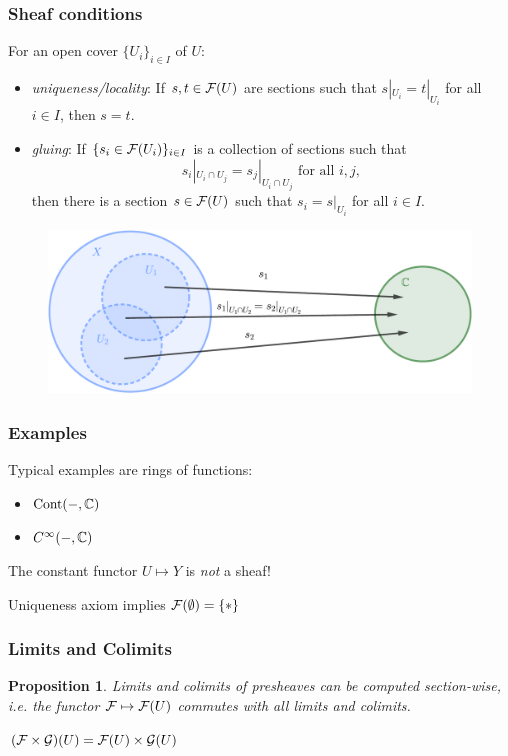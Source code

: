 \documentclass{beamer}
\newtheorem{proposition}{Proposition}
\DeclareMathOperator{\Cont}{Cont}
\begin{document}
\begin{frame}
    \frametitle{Sheaf conditions}

    For an open cover $\{U_i\}_{i\in I}$ of $U$:
    \begin{itemize}
        \item \emph{uniqueness/locality}: If $s,t\in \mathcal{F}(U)$ are sections such that
              $s|_{U_i} = t|_{U_i}$ for all $i\in I$, then $s=t$.
              \pause
        \item \emph{gluing}: If $\{s_i \in \mathcal{F}(U_i)\}_{i\in I}$ is
              a collection of sections such that
              \begin{equation*}
                  s_i|_{U_i \cap U_j} = s_j|_{U_i \cap U_j} \text { for all } i, j,
              \end{equation*}
              then there is a section $s\in \mathcal{F}(U)$ such that $s_i = s|_{U_i}$ for all $i \in I$.
    \end{itemize}
    \begin{figure}
        \centering
        \includegraphics[scale=0.3]{Sheaf_condition.pdf}
    \end{figure}

\end{frame}
\begin{frame}
    \frametitle{Examples}

    Typical examples are rings of functions:
    \begin{itemize}
        \item $\Cont(-, \bbC)$
        \item $C^\infty(-, \mathbb{C})$
    \end{itemize}
    \pause
    \medskip

    \medskip
    The constant functor $U \mapsto Y$ is \emph{not} a sheaf!

    Uniqueness axiom implies $\mathcal{F}(\emptyset) = \{*\}$
\end{frame}

\begin{frame}
    \frametitle{Limits and Colimits}

    \begin{proposition}
        Limits and colimits of presheaves can be computed
        section-wise, i.e. the functor $\mathcal{F} \mapsto \mathcal{F}(U)$
        commutes with all limits and colimits.
    \end{proposition}

    \pause
    \begin{example}
        $(\mathcal{F}\times \mathcal{G} )(U) = \mathcal{F}(U) \times \mathcal{G}(U)$
    \end{example}

\end{frame}
\end{document}
